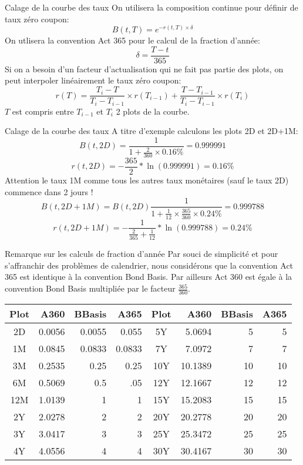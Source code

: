 \documentclass{beamer}
\begin{document}
\begin{frame}{Calage de la courbe des taux}
On utilisera la composition continue pour définir de taux zéro coupon:
\[
B(t,T)=e^{-r(t,T) \times \delta }	
\]
On utlisera la convention Act 365 pour le calcul de la fraction d'année:
\[
\delta = \frac{T-t}{365}
\]
Si on a besoin d'un facteur d'actualisation qui ne fait pas partie des plots, on peut interpoler linéairement le taux zéro coupon:
\[
r(T)=\frac{T_{i}-T}{T_{i}-T_{i-1}}\times r(T_{i-1})+\frac{T-T_{i-1}}{T_{i}-T_{i-1}} \times r(T_{i})
\]
$T$ est compris entre $T_{i-1}$ et $T_{i}$ 2 plots de la courbe.
\end{frame}
\begin{frame}{Calage de la courbe des taux}
A titre d'exemple calculons les plots 2D et 2D+1M:\\
\[
B(t,2D)=\frac{1}{1+\frac{2}{360} \times 0.16\%}=0.999991
\]
\[r(t,2D)=-\frac{365}{2}*\ln(0.999991)=0.16\%
\]
Attention le taux 1M comme tous les autres taux monétaires (sauf le taux 2D) commence dans 2 jours !
\[
B(t,2D+1M)=B(t,2D)\frac{1}{1+\frac{1}{12} \times \frac{365}{360}  \times 0.24\%}=0.999788
\]
\[r(t,2D+1M)=-\frac{1}{\frac{2}{365}+\frac{1}{12}}*\ln(0.999788)=0.24\%
\]
\end{frame}

\begin{frame}{Remarque sur les calculs de fraction d'année}
Par souci de simplicité et pour s'affranchir des problèmes de calendrier, nous considérons que la convention Act 365 est identique à la convention Bond Basis. Par ailleurs Act 360 est égale à la convention Bond Basis multipliée par le facteur $\frac{365}{360}$.
\newline
\newline
\begin{tabular}{|c|r|r|r|c|r|r|r|}
  \hline
   Plot & A360 & BBasis & A365 & Plot & A360 & BBasis & A365 \\
  \hline
 2D & 0.0056 & 0.0055 & 0.055 & 5Y & 5.0694 & 5 & 5\\
 1M & 0.0845 & 0.0833 & 0.0833 & 7Y & 7.0972 & 7 & 7 \\
 3M & 0.2535 & 0.25 & 0.25 & 10Y & 10.1389 & 10 & 10 \\
 6M & 0.5069 & 0.5 & .05  & 12Y & 12.1667 & 12 & 12 \\
 12M & 1.0139 & 1 & 1 & 15Y & 15.2083 & 15 & 15 \\
 2Y & 2.0278 & 2 & 2 & 20Y & 20.2778 & 20 & 20 \\
 3Y & 3.0417 & 3 & 3 & 25Y & 25.3472 & 25 & 25 \\
 4Y & 4.0556 & 4 & 4 & 30Y & 30.4167 & 30 & 30 \\
  \hline
\end{tabular}

\end{frame}
\end{document}
